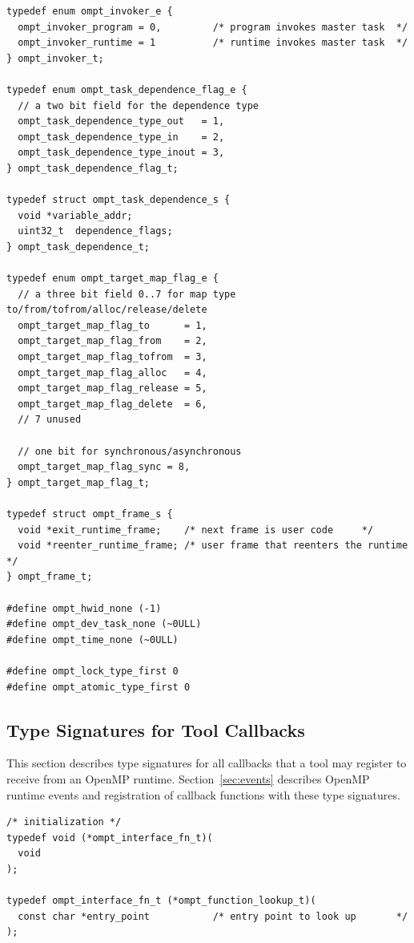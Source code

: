 \documentclass{article}
\begin{document}
{\begin{verbatim}
typedef enum ompt_invoker_e {
  ompt_invoker_program = 0,         /* program invokes master task  */
  ompt_invoker_runtime = 1          /* runtime invokes master task  */
} ompt_invoker_t;

typedef enum ompt_task_dependence_flag_e {
  // a two bit field for the dependence type
  ompt_task_dependence_type_out   = 1,
  ompt_task_dependence_type_in    = 2,
  ompt_task_dependence_type_inout = 3,
} ompt_task_dependence_flag_t;

typedef struct ompt_task_dependence_s {
  void *variable_addr;
  uint32_t  dependence_flags;
} ompt_task_dependence_t;

typedef enum ompt_target_map_flag_e {
  // a three bit field 0..7 for map type to/from/tofrom/alloc/release/delete
  ompt_target_map_flag_to      = 1,
  ompt_target_map_flag_from    = 2,
  ompt_target_map_flag_tofrom  = 3, 
  ompt_target_map_flag_alloc   = 4,
  ompt_target_map_flag_release = 5, 
  ompt_target_map_flag_delete  = 6, 
  // 7 unused

  // one bit for synchronous/asynchronous
  ompt_target_map_flag_sync = 8,   
} ompt_target_map_flag_t;

typedef struct ompt_frame_s {
  void *exit_runtime_frame;    /* next frame is user code     */
  void *reenter_runtime_frame; /* user frame that reenters the runtime  */
} ompt_frame_t;

#define ompt_hwid_none (-1)
#define ompt_dev_task_none (~0ULL)
#define ompt_time_none (~0ULL)

#define ompt_lock_type_first 0
#define ompt_atomic_type_first 0
\end{verbatim}
\clearpage

\subsection{Type Signatures for Tool Callbacks}
\label{appendix:ompt-types:callbacks}
This section describes type signatures for all  callbacks that a tool may register to receive from an OpenMP runtime. Section~\ref{sec:events} describes OpenMP runtime events and registration of
callback functions with these type signatures.

\begin{verbatim}
/* initialization */
typedef void (*ompt_interface_fn_t)(
  void
);

typedef ompt_interface_fn_t (*ompt_function_lookup_t)(
  const char *entry_point           /* entry point to look up       */
);


\end{verbatim}}
\end{document}
